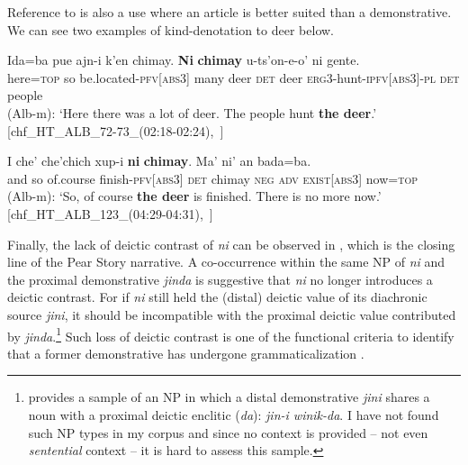\documentclass[output=paper
,modfonts
,nonflat]{langsci/langscibook}
\begin{document}
Reference to  is also a use where an article is better suited than a demonstrative. We can see two examples of kind-denotation to deer below.

\ea \label{ex:pico:52}

\gll Ida=ba pue ajn-i k'en chimay. \textbf{Ni} \textbf{chimay} u-ts'on-e-o' ni gente. \\
{here}=\textsc{top} {so} {be.located}-\textsc{pfv[abs3]}  {many}  {deer}  \textsc{det} {deer}  \textsc{erg3}-hunt-\textsc{ipfv[abs3]}-\textsc{pl}  \textsc{det}  {people}   \\
\glt (Alb-m): `Here there was a lot of deer. The people hunt \textbf{the deer}.' [chf\_HT\_ALB\_72-73\_(02:18-02:24),~\citealt{Delgado-Galvan2018archive}]
\z


\ea  \label{ex:pico:53}

\gll I che' che'chich  xup-i \textbf{ni} \textbf{chimay}. Ma' ni' an bada=ba.\\
and {so} {of.course} finish-\textsc{pfv[abs3]} \textsc{det} {chimay} \textsc{neg} \textsc{adv} \textsc{exist[abs3]} {now}=\textsc{top}  
\\
\glt (Alb-m): `So, of course \textbf{the deer} is finished. There is no more now.' [chf\_HT\_ALB\_123\_(04:29-04:31),~\citealt{Delgado-Galvan2018archive}]

\z


Finally, the lack of deictic contrast of \textit{ni} can be observed in , which is the closing line of the Pear Story narrative. 
A co-occurrence within the same NP of \textit{ni} and the proximal demonstrative \textit{jinda} is suggestive that \textit{ni} no longer introduces a deictic contrast. For if \textit{ni} still held the (distal) deictic value of its diachronic source \textit{jini}, it should be incompatible with the proximal deictic value contributed by \textit{jinda}.\footnote{\citet[208, 236]{Knowles1984} provides a sample of an NP in which a distal demonstrative \textit{jini} shares a noun with a proximal deictic enclitic (\textit{da}): \textit{jin-i winik-da}. I have not found such NP types in my corpus and since no context is provided -- not even \textit{sentential} context -- it is hard to assess this sample.}
Such loss of deictic contrast is one of the functional criteria to identify that a former demonstrative has undergone grammaticalization \citep[][118]{Diessel1999}.

\ea  \label{ex:pico:54}
\end{document}
